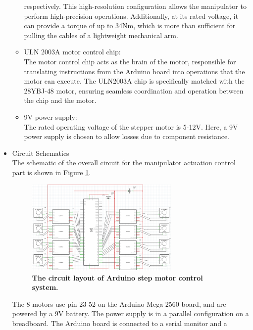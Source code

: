 \begin{itemize}
\begin{itemize}
        respectively. This high-resolution configuration allows the manipulator to perform high-precision 
        operations. Additionally, at its rated voltage, it can provide a torque of up to 34Nm, which is more than 
        sufficient for pulling the cables of a lightweight mechanical arm.
        \item ULN 2003A motor control chip: \\
        The motor control chip acts as the brain of the motor, responsible for translating instructions from the 
        Arduino board into operations that the motor can execute. The ULN2003A chip is specifically matched with 
        the 28YBJ-48 motor, ensuring seamless coordination and operation between the chip and the motor. 
        \item 9V power supply: \\
        The rated operating voltage of the stepper motor is 5-12V. Here, a 9V power supply is chosen to allow 
        losses due to component resistance. 
    \end{itemize}
    \item Circuit Schematics \\
    The schematic of the overall circuit for the manipulator actuation control part is shown in Figure \ref{fig:motor_circuit_layout}.
    \begin{figure}[H] %
        \centering %
        \captionsetup{labelsep=colon}
        \includegraphics[width=0.7\textwidth]{Image/Design/arduino_circuit_layout.png} 
        \caption[The circuit layout of Arduino step motor control system]
        {\centering \textbf{The circuit layout of Arduino step motor control system.}}
        \label{fig:motor_circuit_layout}
    \end{figure}
    The 8 motors use pin 23-52 on the Arduino Mega 2560 board, and are powered by a 9V battery. The power supply 
    is in a parallel configuration on a breadboard. The Arduino board is connected to a serial monitor and a 

\end{itemize}
